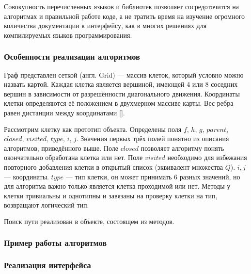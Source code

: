 Совокупность перечисленных языков и библиотек позволяет сосредоточится на алгоритмах и правильной работе коде, а не тратить время на изучение огромного количества документации к интерфейсу, как в многих решениях для компилируемых языков программирования.
\subsubsection{Особенности реализации алгоритмов}
Граф представлен сеткой (англ. Grid) — массив клеток, который условно можно назвать картой. Каждая клетка является вершиной, имеющей 4 или 8 соседних вершин в зависимости от разрешённости диагонального движения. Координаты клетки определяются её положением в двухмерном массиве карты. Вес ребра равен дистанции между координатами [].

Рассмотрим клетку как прототип объекта. Определены поля $f$, $h$, $g$, $parent$, $closed$, $visited$, $type$, $i$, $j$. Значения первых трёх полей понятно из описания алгоритмов, приведённого выше. Поле $closed$ позволяет алгоритму понять окончательно обработана клетка или нет. Поле $visited$ необходимо для избежания повторного добавления клетки в открытый список (эквивалент множества $Q$). $i,j$ — координаты. $type$ — тип клетки, он может принимать 6 разных значений, но для алгоритма важно только является клетка проходимой или нет. Методы у клетки тривиальны и однотипны и завязаны на проверку клетки на тип, возвращают логический тип. 

Поиск пути реализован в объекте, состоящем из методов.
\subsubsection{Пример работы алгоритмов}
\subsubsection{Реализация интерфейса}